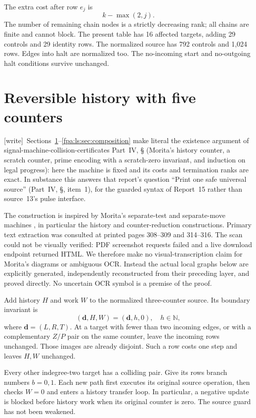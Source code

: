 \documentclass[11pt,a4paper]{article}
\numberwithin{equation}{section}
\newcommand{\N}{\mathbb N}\newcommand{\Z}{\mathbb Z}\newcommand{\R}{\mathbb R}
\newcommand{\wtag}{\textup{[write]}}
\begin{document}
The extra cost after row $e_j$ is
\[
                         k-\max(2,j).                  \tag{6}
\]
The number of remaining chain nodes is a strictly decreasing rank; all chains
are finite and cannot block. The present table has 16 affected targets, adding
29 controls and 29 identity rows. The normalized source has 792 controls and
1,024 rows. Edges into halt are normalized too. The no-incoming start and
no-outgoing halt conditions survive unchanged.
\section{Reversible history with five counters}\label{fpa:ls:sec:history}
\wtag\ Sections~\ref{fpa:ls:sec:history}--\ref{fpa:ls:sec:composition} make literal the existence argument of signal-machine-collision-certificates Part~IV, \S{} (Morita's history counter, a scratch counter, prime encoding with a scratch-zero invariant, and induction on legal progress): here the machine is fixed and its costs and termination ranks are exact. In substance this answers that report's question ``Print one safe universal source'' (Part~IV, \S{}, item~1), for the guarded syntax of Report~15 rather than source~13's pulse interface.

The construction is inspired by Morita's separate-test and separate-move
machines \cite{fpa:morita1996}, in particular the history and counter-reduction
constructions. Primary text extraction was consulted at printed pages
308--309 and 314--316. The scan could not be visually verified: PDF screenshot
requests failed and a live download endpoint returned HTML. We therefore
make no visual-transcription claim for Morita's diagrams or ambiguous OCR.
Instead the actual local graphs below are explicitly generated, independently
reconstructed from their preceding layer, and proved directly. No uncertain
OCR symbol is a premise of the proof.

Add history $H$ and work $W$ to the normalized three-counter source. Its
boundary invariant is
\[
                   (\mathbf d,H,W)=(\mathbf d,h,0),\quad h\in\N, \tag{7}
\]
where $\mathbf d=(L,R,T)$. At a target with fewer than two incoming edges,
or with a complementary $Z/P$ pair on the same counter, leave the incoming
rows unchanged. Those images are already disjoint. Such a row costs one step
and leaves $H,W$ unchanged.

Every other indegree-two target has a colliding pair. Give its rows branch
numbers $b=0,1$. Each new path first executes its original source operation,
then checks $W=0$ and enters a history transfer loop. In particular, a
negative update is blocked before history work when its original counter is
zero. The source guard has not been weakened.
\end{document}
